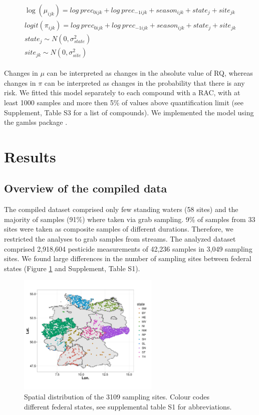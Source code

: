 \documentclass[journal=esthag,manuscript=article]{achemso}
\begin{document}
\begin{align}
\begin{split}
\log(\mu_{ijk}) = log~prec_{0 ijk} + log~prec_{-1 ijk} + season_{ijk} + state_j + site_{jk}\\
logit(\pi_{ijk}) = log~prec_{0 ijk} + log~prec_{-1 ijk} + season_{ijk} + state_j + site_{jk}\\
state_{j} \sim N(0, \sigma^2_{state}) \\
site_{jk} \sim N(0, \sigma^2_{site})
\end{split}
\label{eqn:eqn4}
\end{align}

Changes in $\mu$ can be interpreted as changes in the absolute value of RQ, whereas changes in $\pi$ can be interpreted as changes in the probability that there is any risk.
We fitted this model separately to each compound with a RAC, with at least 1000 samples and more then 5\% of values above quantification limit (see Supplement, Table S3 for a list of compounds). 
We implemented the model using the gamlss package \cite{stasinopoulos_generalized_2007}.




\section{Results}
\subsection{Overview of the compiled data}

The compiled dataset comprised only few standing waters (58 sites) and the majority of samples (91\%) where taken via grab sampling.  %
9\% of samples from 33 sites were taken as composite samples of different durations.
Therefore, we restricted the analyses to grab samples from streams. 
The analyzed dataset comprised 2,918,604 pesticide measurements of 42,236 samples in 3,049 sampling sites.  %
We found large differences in the number of sampling sites between federal states (Figure \ref{fig:fig1} and Supplement, Table S1).

\begin{figure}[ht]
  \includegraphics[width=0.6\textwidth]{figure1.pdf}
  \caption{Spatial distribution of the 3109 sampling sites. Colour codes different federal states, see supplemental table S1 for abbreviations.}
  \label{fig:fig1}
\end{figure}
\end{document}
